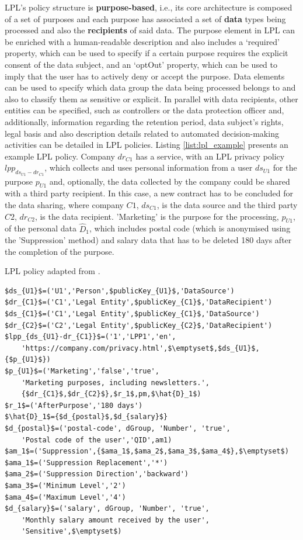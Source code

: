 LPL's policy structure is \textbf{purpose-based}, i.e., its core architecture is composed of a set of purposes and each purpose has associated a set of \textbf{data} types being processed and also the \textbf{recipients} of said data.
The purpose element in LPL can be enriched with a human-readable description and also includes a `required' property, which can be used to specify if a certain purpose requires the explicit consent of the data subject, and an `optOut' property, which can be used to imply that the user has to actively deny or accept the purpose.
Data elements can be used to specify which data group the data being processed belongs to and also to classify them as sensitive or explicit.
In parallel with data recipients, other entities can be specified, such as controllers or the data protection officer and, additionally, information regarding the retention period, data subject's rights, legal basis and also description details related to automated decision-making activities can be detailed in LPL policies.
Listing \ref{list:lpl_example} presents an example LPL policy. Company $dr_{C1}$ has a service, with an LPL privacy policy $lpp_{ds_{U1}-dr_{C1}}$, which collects and uses personal information from a user $ds_{U1}$ for the purpose $p_{U1}$ and, optionally, the data collected by the company could be shared with a third party recipient. In this case, a new contract has to be concluded for the data sharing, where company $C1$, $ds_{C1}$, is the data source and the third party $C2$, $dr_{C2}$, is the data recipient. 'Marketing' is the purpose for the processing, $p_{U1}$, of the personal data $\hat{D}_1$, which includes postal code (which is anonymised using the 'Suppression' method) and salary data that has to be deleted 180 days after the completion of the purpose.

\begin{listing}
\caption{LPL policy adapted from \cite{gerl_lpl_2018}.}
\label{list:lpl_example}
\begin{verbatim}
$ds_{U1}$=('U1','Person',$publicKey_{U1}$,'DataSource')
$dr_{C1}$=('C1','Legal Entity',$publicKey_{C1}$,'DataRecipient')
$ds_{C1}$=('C1','Legal Entity',$publicKey_{C1}$,'DataSource')
$dr_{C2}$=('C2','Legal Entity',$publicKey_{C2}$,'DataRecipient')
$lpp_{ds_{U1}-dr_{C1}}$=('1','LPP1','en',
    'https://company.com/privacy.html',$\emptyset$,$ds_{U1}$,{$p_{U1}$})
$p_{U1}$=('Marketing','false','true',
    'Marketing purposes, including newsletters.',
    {$dr_{C1}$,$dr_{C2}$},$r_1$,pm,$\hat{D}_1$)
$r_1$=('AfterPurpose','180 days')
$\hat{D}_1$={$d_{postal}$,$d_{salary}$}
$d_{postal}$=('postal-code', dGroup, 'Number', 'true',
    'Postal code of the user','QID',am1)
$am_1$=('Suppression',{$ama_1$,$ama_2$,$ama_3$,$ama_4$},$\emptyset$)
$ama_1$=('Suppression Replacement','*')
$ama_2$=('Suppression Direction','backward')
$ama_3$=('Minimum Level','2')
$ama_4$=('Maximum Level','4')
$d_{salary}$=('salary', dGroup, 'Number', 'true', 
    'Monthly salary amount received by the user',
    'Sensitive',$\emptyset$)
\end{verbatim}
\end{listing}

